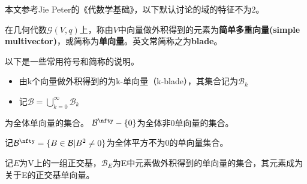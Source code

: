 
本文参考Jie Peter的《代数学基础》，以下默认讨论的域的特征不为2。

\begin{definition}{}
在几何代数$\mathcal G(V,q)$上，称由$V$中向量做外积得到的元素为\textbf{简单多重向量(simple multivector)}，或简称为\textbf{单向量}。英文常简称之为\textbf{blade}。

以下是一些常用符号和简称的说明。
\begin{itemize}
\item 由k个向量做外积得到的为k-单向量（k-blade），其集合记为$\mathcal B_k$
\item 记$\mathcal B=\bigcup \limits ^{\infty}_{k=0}\mathcal B_k$
\end{itemize}为全体单向量的集合。
$\mathcal B^{\nfty}-\{0\}$为全体非0单向量的集合。
\item 记$\mathcal B^{\nfty}=\{B\in\mathcal B|B^2\neq0\}$为全体平方不为0的单向量集合。
\item 记$E$为V上的一组正交基，$\mathcal B_E$为E中元素做外积得到的单向量的集合，其元素成为关于E的正交基单向量。
\end{definition}